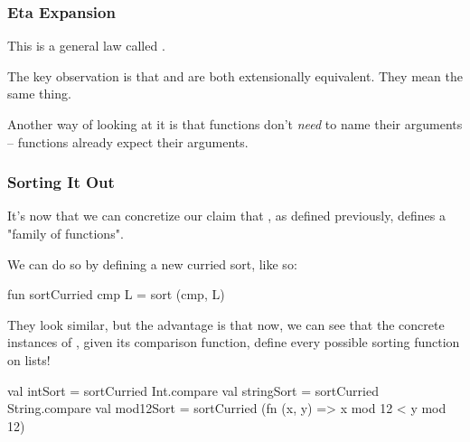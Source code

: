 \documentclass[aspectratio=169]{beamer}
\begin{document}
\begin{frame}[fragile]
  \frametitle{Eta Expansion}

  This is a general law called .

  \pause
  \vspace{\fill}


  \pause
  \vspace{\fill}

  The key observation is that  and  are both
  extensionally equivalent. They mean the same thing.

  \pause
  \vspace{\fill}

  Another way of looking at it is that functions don't \textit{need} to
  name their arguments -- functions already expect their arguments.
\end{frame}


\begin{frame}[fragile]
  \frametitle{Sorting It Out}

  It's now that we can concretize our claim that , as defined previously,
  defines a "family of functions".

  \pause
  \vspace{\fill}

  We can do so by defining a new curried sort, like so:
  \begin{codeblock}
    fun sortCurried cmp L = sort (cmp, L)
  \end{codeblock}

  \pause
  \vspace{\fill}

  They look similar, but the advantage is that now, we can see that the
  concrete instances of , given its comparison function, define
  every possible sorting function on lists!

  \pause
  \vspace{\fill}

  \begin{codeblock}
    val intSort = sortCurried Int.compare
    val stringSort = sortCurried String.compare
    val mod12Sort =
      sortCurried (fn (x, y) => x mod 12 < y mod 12)
  \end{codeblock}
\end{frame}
\end{document}
